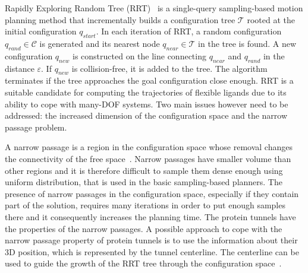 \documentclass{svmult}
\def\qrand{q_{rand}}
\def\qstart{q_{start}}
\def\qinit{\qstart}
\def\qnear{q_{near}}
\def\qnew{q_{new}}
\def\T{\mathcal{T}}
\def\C{\mathcal{C}}
\begin{document}
Rapidly Exploring Random Tree (RRT)~\cite{lavalleRRT} is a single-query sampling-based motion planning method that 
incrementally builds a configuration tree $\T$ rooted at the initial configuration $\qinit$.
In each iteration of RRT, a random configuration $\qrand \in \C$ is generated and its nearest node $\qnear \in \T$ in the tree is found.
A new configuration $\qnew$ is constructed on the line connecting $\qnear$ and $\qrand$ in the distance $\varepsilon$.
If $\qnew$ is collision-free, it is added to the tree.
The algorithm terminates if the tree approaches the goal configuration close enough.
RRT is a suitable candidate for computing the trajectories of flexible ligands due to its ability to cope
with many-DOF systems.
Two main issues however need to be addressed: the increased dimension of the configuration space and the narrow passage problem.



A narrow passage is a region in the configuration space whose removal changes the connectivity of the free space~\cite{hannaWIS}.
Narrow passages have smaller volume than other regions and it is therefore difficult to sample them dense enough using uniform distribution, that is used in the basic sampling-based planners.
The presence of narrow passages in the configuration space, especially if they contain part of the solution, requires many iterations
in order to put enough samples there and it consequently increases the planning time.
The protein tunnels have the properties of the narrow passages. 
A possible approach to cope with the narrow passage property of protein tunnels is to use the information
about their 3D position, which is represented by the tunnel centerline.
The centerline can be used to guide the growth of the RRT tree through the configuration space~\cite{vonasek2009rrt,denny2016dynamic}.
\end{document}
